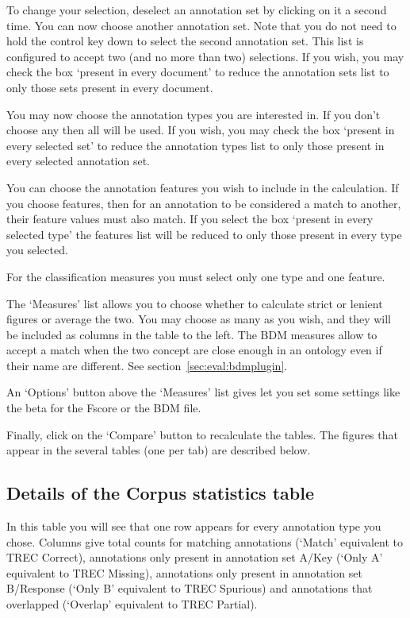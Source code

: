 To change your selection, deselect an annotation set by
clicking on it a second time. You can now choose another annotation set. Note
that you do not need to hold the control key down to select the second
annotation set. This list is configured to accept two (and no more than two)
selections. If you wish, you may check the box `present in every document' to
reduce the annotation sets list to only those sets present in every document.

You may now choose the annotation types you are interested in. If you don't
choose any then all will be used. If you wish, you may check the box
`present in every selected set' to reduce the annotation types list to only
those present in every selected annotation set.

You can choose the annotation features you wish to include in the
calculation. If you choose features, then for an annotation to be considered
a match to another, their feature values must also match. If you select the
box `present in every selected type' the features list will be reduced to
only those present in every type you selected.

For the classification measures you must select only one type and one feature.

The `Measures' list allows you to choose whether to calculate strict or lenient
figures or average the two. You may choose as many as you wish, and they will
be included as columns in the table to the left. The BDM measures allow to
accept a match when the two concept are close enough in an ontology even if
their name are different. See section~\ref{sec:eval:bdmplugin}.

An `Options' button above the `Measures' list gives let you set some
settings like the beta for the Fscore or the BDM file.

Finally, click on the `Compare' button to recalculate the tables. The figures
that appear in the several tables (one per tab) are described below.

\subsection{Details of the Corpus statistics table}

In this table you will see that one row appears for every annotation type
you chose. Columns give total counts for matching annotations (`Match'
equivalent to TREC Correct), annotations only present in annotation set
A/Key (`Only A' equivalent to TREC Missing), annotations only present in
annotation set B/Response (`Only B' equivalent to TREC Spurious) and
annotations that overlapped (`Overlap' equivalent to TREC Partial).

